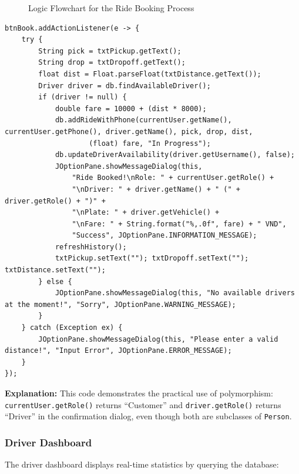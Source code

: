 \documentclass[fonts]{icst}
\begin{document}
\begin{figure}[h!]
    \centering
    \caption{Logic Flowchart for the Ride Booking Process}
    \label{fig:flowchart}
\end{figure}

\begin{lstlisting}[caption={Core booking logic in BookingAppGUI.java}]
btnBook.addActionListener(e -> {
    try {
        String pick = txtPickup.getText();
        String drop = txtDropoff.getText();
        float dist = Float.parseFloat(txtDistance.getText());
        Driver driver = db.findAvailableDriver();
        if (driver != null) {
            double fare = 10000 + (dist * 8000);
            db.addRideWithPhone(currentUser.getName(), currentUser.getPhone(), driver.getName(), pick, drop, dist,
                    (float) fare, "In Progress");
            db.updateDriverAvailability(driver.getUsername(), false);
            JOptionPane.showMessageDialog(this,
                "Ride Booked!\nRole: " + currentUser.getRole() +
                "\nDriver: " + driver.getName() + " (" + driver.getRole() + ")" +
                "\nPlate: " + driver.getVehicle() +
                "\nFare: " + String.format("%,.0f", fare) + " VND",
                "Success", JOptionPane.INFORMATION_MESSAGE);
            refreshHistory();
            txtPickup.setText(""); txtDropoff.setText(""); txtDistance.setText("");
        } else {
            JOptionPane.showMessageDialog(this, "No available drivers at the moment!", "Sorry", JOptionPane.WARNING_MESSAGE);
        }
    } catch (Exception ex) {
        JOptionPane.showMessageDialog(this, "Please enter a valid distance!", "Input Error", JOptionPane.ERROR_MESSAGE);
    }
});
\end{lstlisting}

\textbf{Explanation:} This code demonstrates the practical use of polymorphism: \texttt{currentUser.getRole()} returns ``Customer'' and \texttt{driver.getRole()} returns ``Driver'' in the confirmation dialog, even though both are subclasses of \texttt{Person}.

\subsubsection{Driver Dashboard}

The driver dashboard displays real-time statistics by querying the database:
\end{document}
